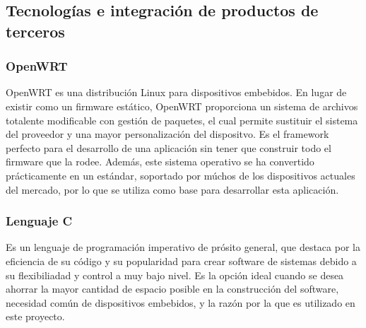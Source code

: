 \documentclass[12pt]{article}
\begin{document}
    \subsection{Tecnologías e integración de productos de terceros}
        \subsubsection{OpenWRT}
            OpenWRT es una distribución Linux para dispositivos embebidos. En lugar de existir como un firmware estático, OpenWRT proporciona un sistema de archivos totalente modificable con gestión de paquetes, el cual permite sustituir el sistema del proveedor y una mayor personalización del dispositvo. Es el framework perfecto para el desarrollo de una aplicación sin tener que construir todo el firmware que la rodee. Además, este sistema operativo se ha convertido prácticamente en un estándar, soportado por múchos de los dispositivos actuales del mercado, por lo que se utiliza como base para desarrollar esta aplicación.

        \subsubsection{Lenguaje C}
            Es un lenguaje de programación imperativo de prósito general, que destaca por la eficiencia de su código y su popularidad para crear software de sistemas debido a su flexibiliadad y control a muy bajo nivel. Es la opción ideal cuando se desea ahorrar la mayor cantidad de espacio posible en la construcción del software, necesidad común de dispositivos embebidos, y la razón por la que es utilizado en este proyecto.
\end{document}
